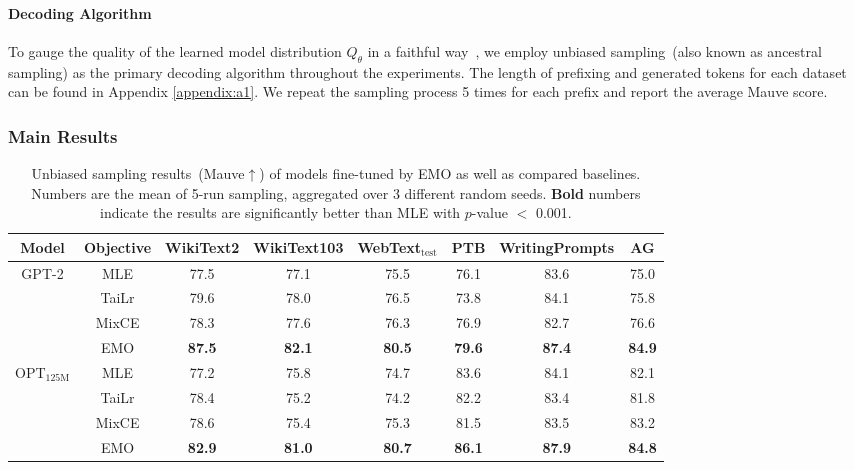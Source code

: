 \paragraph{Decoding Algorithm}
To gauge the quality of the learned model distribution $Q_{\theta}$ in a faithful way~\citep{eikema2020map}, we employ unbiased sampling~(also known as ancestral sampling) as the primary decoding algorithm throughout the experiments. The length of prefixing and generated tokens for each dataset can be found in Appendix \ref{appendix:a1}. We repeat the sampling process 5 times for each prefix and report the average 
Mauve score.
\subsubsection{Main Results}
\begin{table}[h!]
    \centering
    \footnotesize
    \caption{Unbiased sampling results~(Mauve$\uparrow$) of models fine-tuned by EMO as well as compared baselines. Numbers are the mean of 5-run sampling, aggregated over 3 different random seeds. \textbf{Bold} numbers indicate the results are significantly better than MLE with $p$-value $<$ 0.001.}
    \begin{tabular}{cc|cccccc}
    \toprule
    \textbf{Model}                     & \textbf{Objective} & \textbf{WikiText2}    & \textbf{WikiText103}  & \textbf{WebText$_{\text{test}}$}  & \textbf{PTB}           & \textbf{WritingPrompts} & \textbf{AG}       \\
    \midrule
    \multirow{4}{*}{GPT-2}    & MLE       & 77.5          & 77.1          & 75.5          & 76.1          & 83.6           & 75.0          \\
                              & TaiLr     & 79.6          & 78.0          & 76.5          & 73.8          & 84.1           & 75.8          \\
                              & MixCE     & 78.3          & 77.6          & 76.3          & 76.9          & 82.7           & 76.6          \\
                              & EMO    & \textbf{87.5} & \textbf{82.1} & \textbf{80.5} & \textbf{79.6} & \textbf{87.4}  & \textbf{84.9} \\
    \midrule
    \multirow{4}{*}{OPT$_{\text{125M}}$} & MLE       & 77.2          & 75.8          & 74.7          & 83.6          & 84.1           & 82.1          \\
                              & TaiLr     & 78.4          & 75.2          & 74.2          & 82.2          & 83.4           & 81.8          \\
                              & MixCE     & 78.6          & 75.4          & 75.3          & 81.5          & 83.5           & 83.2          \\
                              & EMO    & \textbf{82.9} & \textbf{81.0} & \textbf{80.7} & \textbf{86.1} & \textbf{87.9}  & \textbf{84.8} \\
    \bottomrule
    \end{tabular}
    \label{table:mauve}
\end{table}
